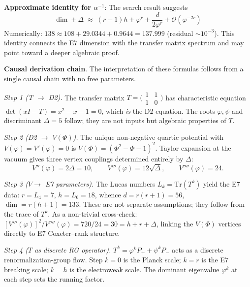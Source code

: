 \documentclass[11pt,a4paper]{article}
\begin{document}
\medskip
\noindent\textbf{Approximate identity for $\alpha^{-1}$}: The search result suggests
\begin{equation}
\dim + \Delta \;\approx\; (r-1)h + \varphi^r + \frac{d}{2\varphi^r} + \mathcal{O}(\varphi^{-2r})
\end{equation}
Numerically: $138 \approx 108 + 29.0344 + 0.9644 = 137.999$ (residual $\sim 10^{-3}$). This identity connects the E7 dimension with the transfer matrix spectrum and may point toward a deeper algebraic proof.

\medskip
\noindent\textbf{Causal derivation chain}. The interpretation of these formulas follows from a single causal chain with no free parameters.

\smallskip
\noindent\textit{Step 1 (T $\to$ D2).} The transfer matrix $T = \bigl(\begin{smallmatrix}1&1\\1&0\end{smallmatrix}\bigr)$ has characteristic equation $\det(xI - T) = x^2 - x - 1 = 0$, which \emph{is} the D2 equation. The roots $\varphi, \psi$ and discriminant $\Delta = 5$ follow; they are not inputs but algebraic properties of $T$.

\smallskip
\noindent\textit{Step 2 (D2 $\to$ $V(\Phi)$).} The unique non-negative quartic potential with $V(\varphi) = V'(\varphi) = 0$ is $V(\Phi) = (\Phi^2 - \Phi - 1)^2$. Taylor expansion at the vacuum gives three vertex couplings determined entirely by $\Delta$:
\begin{equation}
V''(\varphi) = 2\Delta = 10, \qquad
V'''(\varphi) = 12\sqrt{\Delta}, \qquad
V''''(\varphi) = 24.
\end{equation}

\noindent\textit{Step 3 ($V \to$ E7 parameters).} The Lucas numbers $L_k = \mathrm{Tr}(T^k)$ yield the E7 data: $r = L_4 = 7$, $h = L_6 = 18$, whence $d = r(r+1) = 56$, $\dim = r(h+1) = 133$. These are not separate assumptions; they follow from the trace of $T^k$. As a non-trivial cross-check: $[V'''(\varphi)]^2/V''''(\varphi) = 720/24 = 30 = h + r + \Delta$, linking the $V(\Phi)$ vertices directly to E7 Coxeter--rank structure.

\smallskip
\noindent\textit{Step 4 ($T$ as discrete RG operator).} $T^k = \varphi^k P_+ + \psi^k P_-$ acts as a discrete renormalization-group flow. Step $k = 0$ is the Planck scale; $k = r$ is the E7 breaking scale; $k = h$ is the electroweak scale. The dominant eigenvalue $\varphi^k$ at each step sets the running factor.
\end{document}
